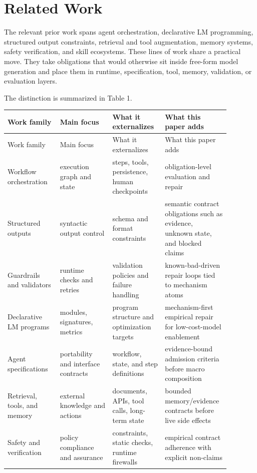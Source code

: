 \documentclass[11pt]{article}
\begin{document}
\section{Related Work}

The relevant prior work spans agent orchestration, declarative LM programming, structured output constraints, retrieval and tool augmentation, memory systems, safety verification, and skill ecosystems. These lines of work share a practical move. They take obligations that would otherwise sit inside free-form model generation and place them in runtime, specification, tool, memory, validation, or evaluation layers.

The distinction is summarized in Table 1.

{\small
\setlength{\tabcolsep}{3pt}
\begin{longtable}{>{\raggedright\arraybackslash}p{0.220\linewidth}>{\raggedright\arraybackslash}p{0.220\linewidth}>{\raggedright\arraybackslash}p{0.220\linewidth}>{\raggedright\arraybackslash}p{0.220\linewidth}}
\toprule
Work family & Main focus & What it externalizes & What this paper adds \\
\midrule
\endfirsthead
\toprule
Work family & Main focus & What it externalizes & What this paper adds \\
\midrule
\endhead
Workflow orchestration & execution graph and state & steps, tools, persistence, human checkpoints & obligation-level evaluation and repair \\
Structured outputs & syntactic output control & schema and format constraints & semantic contract obligations such as evidence, unknown state, and blocked claims \\
Guardrails and validators & runtime checks and retries & validation policies and failure handling & known-bad-driven repair loops tied to mechanism atoms \\
Declarative LM programs & modules, signatures, metrics & program structure and optimization targets & mechanism-first empirical repair for low-cost-model enablement \\
Agent specifications & portability and interface contracts & workflow, state, and step definitions & evidence-bound admission criteria before macro composition \\
Retrieval, tools, and memory & external knowledge and actions & documents, APIs, tool calls, long-term state & bounded memory/evidence contracts before live side effects \\
Safety and verification & policy compliance and assurance & constraints, static checks, runtime firewalls & empirical contract adherence with explicit non-claims \\
\bottomrule
\end{longtable}
}
\end{document}
